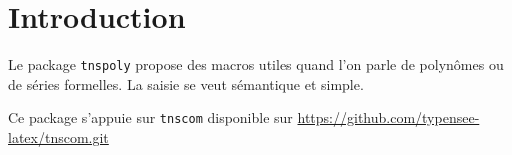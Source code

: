 \documentclass[12pt,a4paper]{article}
\begin{document}
\section{Introduction}

Le package \verb+tnspoly+ propose des macros utiles quand l'on parle de polynômes ou de séries formelles.
La saisie se veut sémantique et simple.

\begin{remark}
	Ce package s'appuie sur \verb+tnscom+ disponible sur \url{https://github.com/typensee-latex/tnscom.git}
\end{remark}
\end{document}
